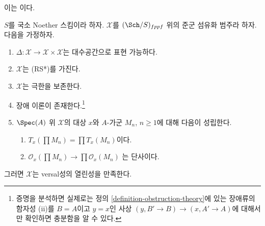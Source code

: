 \begin{lemma}
\label{lemma-get-openness-obstruction-theory}
\begin{reference}
이는 \cite[Theorem 4.4]{Hall-coherent}이다.
\end{reference}
$S$를 국소 Noether 스킴이라 하자. $\mathcal{X}$를
$(\Sch/S)_{fppf}$ 위의 준군 섬유화 범주라 하자. 다음을 가정하자.
\begin{enumerate}
\item $\Delta : \mathcal{X} \to \mathcal{X} \times \mathcal{X}$는
대수공간으로 표현 가능하다.
\item $\mathcal{X}$는 (RS*)를 가진다.
\item $\mathcal{X}$는 극한을 보존한다.
\item 장애 이론이 존재한다.\footnote{증명을 분석하면 실제로는
정의 \ref{definition-obstruction-theory}에 있는 장애류의 함자성 (ii)를
$B = A$이고 $y = x$인 사상 $(y, B' \to B) \to (x, A' \to A)$에 대해서만
확인하면 충분함을 알 수 있다.}
\item $\Spec(A)$ 위 $\mathcal{X}$의 대상 $x$와
$A$-가군 $M_n$, $n \geq 1$에 대해 다음이 성립한다.
\begin{enumerate}
\item $T_x(\prod M_n) = \prod T_x(M_n)$이다.
\item $\mathcal{O}_x(\prod M_n) \to \prod \mathcal{O}_x(M_n)$
는 단사이다.
\end{enumerate}
\end{enumerate}
그러면 $\mathcal{X}$는 versal성의 열린성을 만족한다.
\end{lemma}


